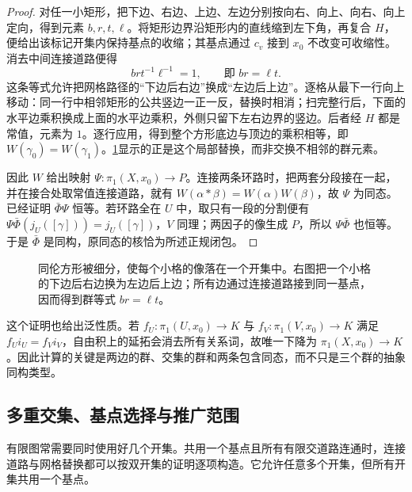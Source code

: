 \begin{proof}
	对任一小矩形，把下边、右边、上边、左边分别按向右、向上、向右、向上定向，得到元素 \(b,r,t,\ell\)。将矩形边界沿矩形内的直线缩到左下角，再复合 \(H\)，便给出该标记开集内保持基点的收缩；其基点通过 \(c_v\) 接到 \(x_0\) 不改变可收缩性。消去中间连接道路便得
	\[
		brt^{-1}\ell^{-1}=1,\qquad\text{即 }br=\ell t.
	\]
	这条等式允许把网格路径的“下边后右边”换成“左边后上边”。逐格从最下一行向上移动：同一行中相邻矩形的公共竖边一正一反，替换时相消；扫完整行后，下面的水平边乘积换成上面的水平边乘积，外侧只留下左右边界的竖边。后者经 \(H\) 都是常值，元素为 \(1\)。逐行应用，得到整个方形底边与顶边的乘积相等，即 \(W(\gamma_0)=W(\gamma_1)\)。\cref{g1:fig:van-kampen-grid}显示的正是这个局部替换，而非交换不相邻的群元素。

	因此 \(W\) 给出映射 \(\Psi:\pi_1(X,x_0)\to P\)。连接两条环路时，把两套分段接在一起，并在接合处取常值连接道路，就有 \(W(\alpha*\beta)=W(\alpha)W(\beta)\)，故 \(\Psi\) 为同态。已经证明 \(\bar\Phi\Psi\) 恒等。若环路全在 \(U\) 中，取只有一段的分割便有 \(\Psi\bar\Phi(j_U([\gamma]))=j_U([\gamma])\)，\(V\) 同理；两因子的像生成 \(P\)，所以 \(\Psi\bar\Phi\) 也恒等。于是 \(\bar\Phi\) 是同构，原同态的核恰为所述正规闭包。
\end{proof}

\begin{figure}[htbp]
	\centering
	
	\caption[同伦方格中的道路替换]{同伦方形被细分，使每个小格的像落在一个开集中。右图把一个小格的下边后右边换为左边后上边；所有边通过连接道路接到同一基点，因而得到群等式 \(br=\ell t\)。}
	\label{g1:fig:van-kampen-grid}
\end{figure}

这个证明也给出泛性质。若 \(f_U:\pi_1(U,x_0)\to K\) 与 \(f_V:\pi_1(V,x_0)\to K\) 满足 \(f_Ui_U=f_Vi_V\)，自由积上的延拓会消去所有关系词，故唯一下降为 \(\pi_1(X,x_0)\to K\)。因此计算的关键是两边的群、交集的群和两条包含同态，而不只是三个群的抽象同构类型。

\subsection{多重交集、基点选择与推广范围}
\label{g1:subsec:0502:03}

有限图常需要同时使用好几个开集。共用一个基点且所有有限交道路连通时，连接道路与网格替换都可以按双开集的证明逐项构造。它允许任意多个开集，但所有开集共用一个基点。


